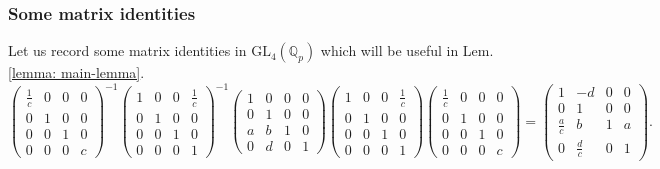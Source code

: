 \documentclass[11pt]{amsart}
\newcommand{\GL}{\mathrm{GL}}
\begin{document}
\subsubsection{Some matrix identities}
\label{sec:matrix-identities}
Let us record some matrix identities in $\GL_4(\mathbb{Q}_p)$ which will be useful in Lem.\,\ref{lemma: main-lemma}.
$$
	\left(\begin{smallmatrix}
		\frac{1}{c} & 0 & 0 & 0 \\
		0 & 1 & 0 & 0 \\
		0 & 0 & 1 & 0 \\
		0 & 0 & 0 & c
	\end{smallmatrix}\right)^{-1} \left(\begin{smallmatrix}
		1 & 0 & 0 & \frac{1}{c} \\
		0 & 1 & 0 & 0 \\
		0 & 0 & 1 & 0 \\
		0 & 0 & 0 & 1
	\end{smallmatrix}\right)^{-1} \left(\begin{smallmatrix}
		1 & 0 & 0 & 0 \\
		0 & 1 & 0 & 0 \\
		a & b & 1 & 0 \\
		0 & d & 0 & 1
	\end{smallmatrix}\right)
	\left(\begin{smallmatrix}
		1 & 0 & 0 & \frac{1}{c} \\
		0 & 1 & 0 & 0 \\
		0 & 0 & 1 & 0 \\
		0 & 0 & 0 & 1
	\end{smallmatrix}\right)
	\left(\begin{smallmatrix}
		\frac{1}{c} & 0 & 0 & 0 \\
		0 & 1 & 0 & 0 \\
		0 & 0 & 1 & 0 \\
		0 & 0 & 0 & c
	\end{smallmatrix}\right) = 
	\left(\begin{smallmatrix}
		1 & -d & 0 & 0 \\
		0 & 1 & 0 & 0 \\
		\frac{a}{c} & b & 1 & a \\
		0 & \frac{d}{c} & 0 & 1
	\end{smallmatrix}\right). 
$$
\end{document}
